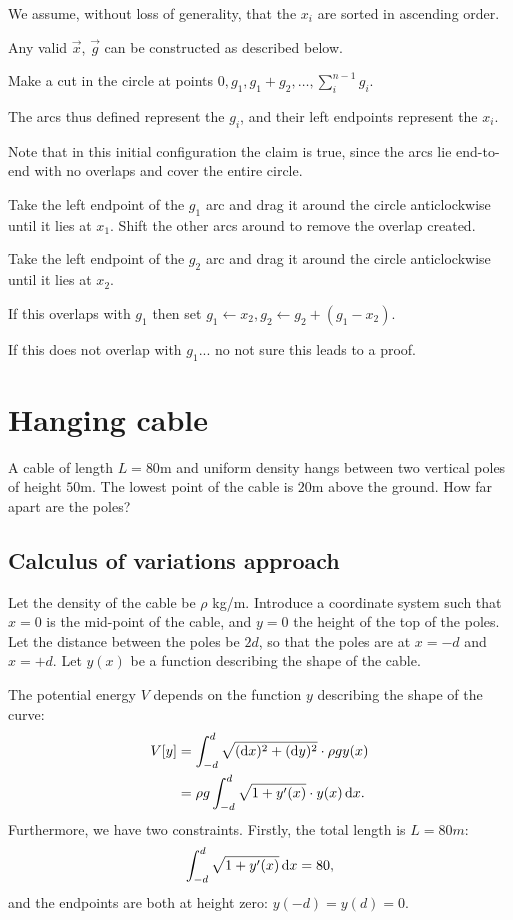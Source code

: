 \documentclass[12pt]{article}
\begin{document}
We assume, without loss of generality, that the $x_i$ are sorted in ascending order.

Any valid $\vec x$, $\vec g$ can be constructed as described below.

Make a cut in the circle at points $0, g_1, g_1 + g_2, \ldots, \sum_i^{n-1}g_i$.

The arcs thus defined represent the $g_i$, and their left endpoints represent the $x_i$.

Note that in this initial configuration the claim is true, since the arcs lie end-to-end with no
overlaps and cover the entire circle.

Take the left endpoint of the $g_1$ arc and drag it around the circle anticlockwise until it lies
at $x_1$. Shift the other arcs around to remove the overlap created.

Take the left endpoint of the $g_2$ arc and drag it around the circle anticlockwise until it lies
at $x_2$.

If this overlaps with $g_1$ then set $g_1 \leftarrow x_2, g_2 \leftarrow g_2 + (g_1 - x_2)$.

If this does not overlap with $g_1$... no not sure this leads to a proof.

\section{Hanging cable}

\begin{mdframed}
  A cable of length $L=80$m and uniform density hangs between two vertical poles of height
  $50$m. The lowest point of the cable is $20$m above the ground. How far apart are the poles?
\end{mdframed}

\subsection{Calculus of variations approach}

Let the density of the cable be $\rho$ kg/m. Introduce a coordinate system such that $x=0$ is the mid-point of
the cable, and $y = 0$ the height of the top of the poles. Let the distance between the poles be $2d$, so that
the poles are at $x = -d$ and $x = +d$. Let $y(x)$ be a function describing the shape of the cable.

The potential energy $V$ depends on the function $y$ describing the shape of the curve:
\begin{align*}
  V[y]
  &= \int_{-d}^d \sqrt{(\dx)^2 + (\dy)^2} \cdot \rho g y(x) \\
  &= \rho g \int_{-d}^d \sqrt{1 + y'(x)} \cdot y(x) \dx. \\
\end{align*}
Furthermore, we have two constraints. Firstly, the total length is $L = 80m$:
\begin{align*}
  \int_{-d}^d \sqrt{1 + y'(x)} \dx = 80,
\end{align*}
and the endpoints are both at height zero: $y(-d) = y(d) = 0$.
\end{document}
